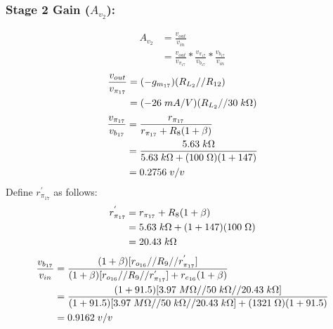 \documentclass{article}
\begin{document}
	\pagebreak
	\subsubsection*{Stage 2 Gain ($A_{v_2}$):}
	\begin{align*}
		A_{v_2} &= \frac{v_{out}}{v_{in}}\\
		&= \frac{v_{out}}{v_{\pi_{17}}} * \frac{v_{\pi_{17}}}{v_{b_{17}}} * \frac{v_{b_{17}}}{v_{in}}
	\end{align*}
	\begin{align*}
		\frac{v_{out}}{v_{\pi_{17}}} &= (-g_{m_{17}}) (R_{L_2} // R_{12})\\
		&= (-26 \hspace{1mm} mA/V)(R_{L_2} // 30 \hspace{1mm} k\Omega)	
	\end{align*}
	\begin{align*}
		\frac{v_{\pi_{17}}}{v_{b_{17}}} &= \frac{r_{\pi_{17}}}{r_{\pi_{17}} + R_8(1+ \beta)}\\
		&= \frac{5.63 \hspace{1mm} k\Omega}{5.63 \hspace{1mm} k\Omega + (100 \hspace{1mm} \Omega)(1 + 147)}\\
		&= 0.2756 \hspace{1mm} v/v
	\end{align*}
		Define $r_{\pi_{17}}^{'}$ as follows:
	\begin{align*}
		r_{\pi_{17}}^{'} &= r_{\pi_{17}} + R_8(1 + \beta)\\
		&= 5.63 \hspace{1mm} k\Omega + (1 + 147) (100 \hspace{1mm} \Omega)\\
		&= 20.43 \hspace{1mm} k\Omega
	\end{align*}
	\begin{align*}
		\frac{v_{b_{17}}}{v_{in}} &= \frac{(1 + \beta)[r_{o_{16}} // R_9 // r_{\pi_{17}}^{'}]}{(1 + \beta)[r_{o_{16}} // R_9 // r_{\pi_{17}}^{'}] + r_{e_{16}} (1 + \beta)}\\
		&= \frac{(1 + 91.5) [3.97 \hspace{1mm} M\Omega // 50 \hspace{1mm} k\Omega // 20.43 \hspace{1mm} k\Omega]}{(1 + 91.5) [3.97 \hspace{1mm} M\Omega // 50 \hspace{1mm} k\Omega // 20.43 \hspace{1mm} k\Omega] + (1321 \hspace{1mm} \Omega)(1 + 91.5)}\\
		&= 0.9162 \hspace{1mm} v/v
	\end{align*}
\end{document}
